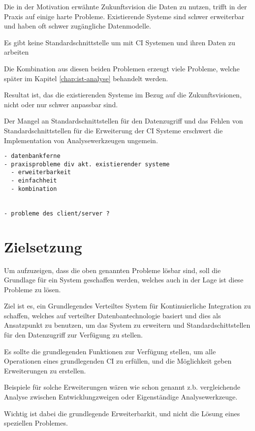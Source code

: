 Die in der Motivation erw\"ahnte Zukunftsvision die Daten zu nutzen,
trifft in der Praxis auf einige harte Probleme.
Existierende Systeme sind schwer erweiterbar und haben oft schwer zugängliche Datenmodelle.

Es gibt keine Standardschnittstelle um mit CI Systemen und ihren Daten zu arbeiten

Die Kombination aus diesen beiden Problemen erzeugt viele Probleme,
welche später im Kapitel \ref{chap:ist-analyse} behandelt werden.

Resultat ist, das die existierenden Systeme im Bezug auf die Zukunftsvisionen,
nicht oder nur schwer anpassbar sind.

Der Mangel an Standardschnittstellen für den Datenzugriff und
das Fehlen von Standardschnittstellen für die Erweiterung der CI Systeme
erschwert die Implementation von Analysewerkzeugen ungemein.





\begin{verbatim}
- datenbankferne
- praxisprobleme div akt. existierender systeme
  - erweiterbarkeit
  - einfachheit
  - kombination


- probleme des client/server ?

\end{verbatim}

\section{Zielsetzung}

Um aufzuzeigen, dass die oben genannten Probleme lösbar sind,
soll die Grundlage für ein System geschaffen werden,
welches auch in der Lage ist diese Probleme zu lösen.

Ziel ist es, ein Grundlegendes Verteiltes System f\"ur Kontinuierliche Integration zu schaffen,
welches auf verteilter Datenbantechnologie basiert und dies als Ansatzpunkt zu benutzen,
um das System zu erweitern und Standardschittstellen f\"ur den Datenzugriff zur Verf\"ugung zu stellen.

Es sollte die grundlegenden Funktionen zur Verfügung stellen,
um alle Operationen eines grundlegenden CI zu erf\"ullen,
und die M\"oglichkeit geben Erweiterungen zu erstellen.

Beispiele f\"ur solche Erweiterungen wären wie schon genannt
z.b. vergleichende Analyse zwischen Entwicklungzweigen oder Eigenständige Analysewerkzeuge.

Wichtig ist dabei die grundlegende Erweiterbarkit,
und nicht die L\"osung eines speziellen Problemes.


